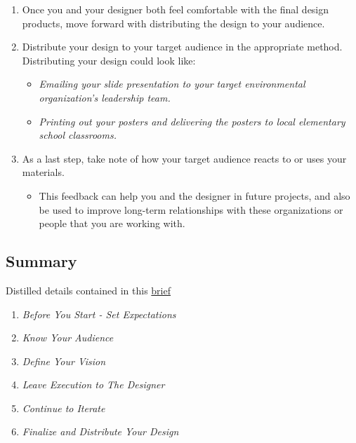 \documentclass[
]{book}
\providecommand{\tightlist}{%
  \setlength{\itemsep}{0pt}\setlength{\parskip}{0pt}}
\begin{document}
\begin{enumerate}
\def\labelenumi{\arabic{enumi}.}
\tightlist
\item
  Once you and your designer both feel comfortable with the final design products, move forward with distributing the design to your audience.
\item
  Distribute your design to your target audience in the appropriate method. Distributing your design could look like:

  \begin{itemize}
  \tightlist
  \item
    \emph{Emailing your slide presentation to your target environmental organization's leadership team.}
  \item
    \emph{Printing out your posters and delivering the posters to local elementary school classrooms.}
  \end{itemize}
\item
  As a last step, take note of how your target audience reacts to or uses your materials.

  \begin{itemize}
  \tightlist
  \item
    This feedback can help you and the designer in future projects, and also be used to improve long-term relationships with these organizations or people that you are working with.
  \end{itemize}
\end{enumerate}

\hypertarget{summary-4}{%
\subsection{Summary}\label{summary-4}}

Distilled details contained in this \href{files/M4-S3.Working-With-Graphic-Designers.Brief.pdf}{brief}

\begin{enumerate}
\def\labelenumi{\arabic{enumi}.}
\tightlist
\item
  \emph{Before You Start - Set Expectations}
\item
  \emph{Know Your Audience}
\item
  \emph{Define Your Vision}
\item
  \emph{Leave Execution to The Designer}
\item
  \emph{Continue to Iterate}
\item
  \emph{Finalize and Distribute Your Design}
\end{enumerate}
\end{document}
